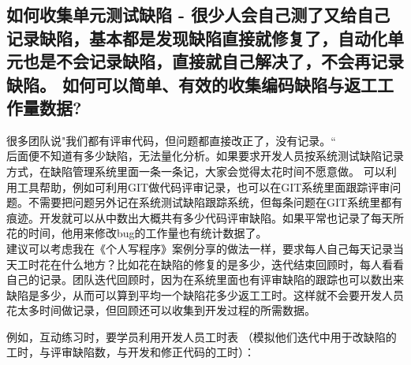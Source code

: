\hypertarget{ux5982ux4f55ux6536ux96c6ux5355ux5143ux6d4bux8bd5ux7f3aux9677---ux5f88ux5c11ux4ebaux4f1aux81eaux5df1ux6d4bux4e86ux53c8ux7ed9ux81eaux5df1ux8bb0ux5f55ux7f3aux9677ux57faux672cux90fdux662fux53d1ux73b0ux7f3aux9677ux76f4ux63a5ux5c31ux4feeux590dux4e86ux81eaux52a8ux5316ux5355ux5143ux4e5fux662fux4e0dux4f1aux8bb0ux5f55ux7f3aux9677ux76f4ux63a5ux5c31ux81eaux5df1ux89e3ux51b3ux4e86ux4e0dux4f1aux518dux8bb0ux5f55ux7f3aux9677-ux5982ux4f55ux53efux4ee5ux7b80ux5355ux6709ux6548ux7684ux6536ux96c6ux7f16ux7801ux7f3aux9677ux4e0eux8fd4ux5de5ux5de5ux4f5cux91cfux6570ux636e}{%
\subsection{如何收集单元测试缺陷 -
很少人会自己测了又给自己记录缺陷，基本都是发现缺陷直接就修复了，自动化单元也是不会记录缺陷，直接就自己解决了，不会再记录缺陷。
如何可以简单、有效的收集编码缺陷与返工工作量数据?}\label{ux5982ux4f55ux6536ux96c6ux5355ux5143ux6d4bux8bd5ux7f3aux9677---ux5f88ux5c11ux4ebaux4f1aux81eaux5df1ux6d4bux4e86ux53c8ux7ed9ux81eaux5df1ux8bb0ux5f55ux7f3aux9677ux57faux672cux90fdux662fux53d1ux73b0ux7f3aux9677ux76f4ux63a5ux5c31ux4feeux590dux4e86ux81eaux52a8ux5316ux5355ux5143ux4e5fux662fux4e0dux4f1aux8bb0ux5f55ux7f3aux9677ux76f4ux63a5ux5c31ux81eaux5df1ux89e3ux51b3ux4e86ux4e0dux4f1aux518dux8bb0ux5f55ux7f3aux9677-ux5982ux4f55ux53efux4ee5ux7b80ux5355ux6709ux6548ux7684ux6536ux96c6ux7f16ux7801ux7f3aux9677ux4e0eux8fd4ux5de5ux5de5ux4f5cux91cfux6570ux636e}}

很多团队说"我们都有评审代码，但问题都直接改正了，没有记录。``\\
后面便不知道有多少缺陷，无法量化分析。如果要求开发人员按系统测试缺陷记录方式，在缺陷管理系统里面一条一条记，大家会觉得太花时间不愿意做。
可以利用工具帮助，例如可利用GIT做代码评审记录，也可以在GIT系统里面跟踪评审问题。不需要把问题另外记在系统测试缺陷跟踪系统，但每条问题在GIT系统里都有痕迹。开发就可以从中数出大概共有多少代码评审缺陷。如果平常也记录了每天所花的时间，他用来修改bug的工作量也有统计数据了。\\
建议可以考虑我在《个人写程序》案例分享的做法一样，要求每人自己每天记录当天工时花在什么地方？比如花在缺陷的修复的是多少，迭代结束回顾时，每人看看自己的记录。团队迭代回顾时，因为在系统里面也有评审缺陷的跟踪也可以数出来缺陷是多少，从而可以算到平均一个缺陷花多少返工工时。这样就不会要开发人员花太多时间做记录，但回顾还可以收集到开发过程的所需数据。

例如，互动练习时，要学员利用开发人员工时表
（模拟他们迭代中用于改缺陷的工时，与评审缺陷数，与开发和修正代码的工时）：

